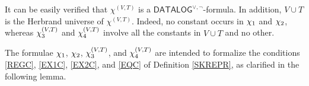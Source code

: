 \documentclass[a4paper]{llncs}
\newcommand{\DisjDatalog}{\ensuremath{\mathsf{DATALOG}^{\vee,\neg}}\xspace}
\newcommand{\pairin}[3]{\left[#1,#2\right] \in #3}
\newcommand{\nonpairin}[2]{#1 \in \bar{\pi}(#2)}
\newcommand{\seteq}[2]{#1=#2}
\begin{document}
It can be easily verified that $\chi^{(V,T)}$ is a
$\DisjDatalog$-formula. In addition, $V \cup T$ is the Herbrand
universe of $\chi^{(V,T)}$. Indeed, no constant occurs in
$\chi_1$ and $\chi_2$, whereas $\chi_3^{(V,T)}$ and $\chi_4^{(V,T)}$ involve
all the constants in $V \cup T$ and no other.

%
The formulae $\chi_1$, $\chi_2$, $\chi_3^{(V,T)}$, and $\chi_4^{(V,T)}$ are intended 
to formalize the conditions \ref{REGC}, \ref{EX1C}, \ref{EX2C}, and 
\ref{EQC} of
Definition \ref{SKREPR}, as clarified in the following lemma.
\end{document}

